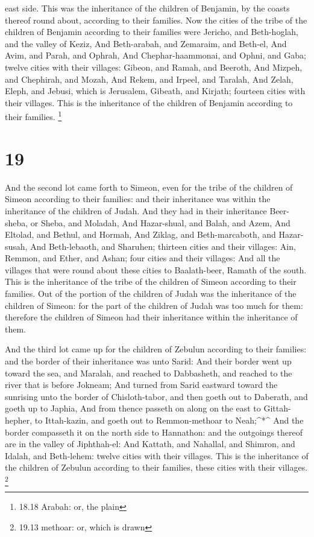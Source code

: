 east side. This was the inheritance of the children of Benjamin, by the
coasts thereof round about, according to their families. 
Now the cities of the tribe of the children of Benjamin according to
their families were Jericho, and Beth-hoglah, and the valley of Keziz,
 And Beth-arabah, and Zemaraim, and Beth-el, 
And Avim, and Parah, and Ophrah,  And Chephar-haammonai,
and Ophni, and Gaba; twelve cities with their villages: 
Gibeon, and Ramah, and Beeroth,  And Mizpeh, and Chephirah,
and Mozah,  And Rekem, and Irpeel, and Taralah,
 And Zelah, Eleph, and Jebusi, which is Jerusalem, Gibeath,
and Kirjath; fourteen cities with their villages. This is the
inheritance of the children of Benjamin according to their families.
\footnote{18.18 Arabah: or, the plain}

\hypertarget{section-18}{%
\section{19}\label{section-18}}

 And the second lot came forth to Simeon, even for the tribe
of the children of Simeon according to their families: and their
inheritance was within the inheritance of the children of Judah.
 And they had in their inheritance Beer-sheba, or Sheba, and
Moladah,  And Hazar-shual, and Balah, and Azem, 
And Eltolad, and Bethul, and Hormah,  And Ziklag, and
Beth-marcaboth, and Hazar-susah,  And Beth-lebaoth, and
Sharuhen; thirteen cities and their villages:  Ain, Remmon,
and Ether, and Ashan; four cities and their villages:  And
all the villages that were round about these cities to Baalath-beer,
Ramath of the south. This is the inheritance of the tribe of the
children of Simeon according to their families.  Out of the
portion of the children of Judah was the inheritance of the children of
Simeon: for the part of the children of Judah was too much for them:
therefore the children of Simeon had their inheritance within the
inheritance of them.

 And the third lot came up for the children of Zebulun
according to their families: and the border of their inheritance was
unto Sarid:  And their border went up toward the sea, and
Maralah, and reached to Dabbasheth, and reached to the river that is
before Jokneam;  And turned from Sarid eastward toward the
sunrising unto the border of Chisloth-tabor, and then goeth out to
Daberath, and goeth up to Japhia,  And from thence passeth
on along on the east to Gittah-hepher, to Ittah-kazin, and goeth out to
Remmon-methoar to Neah;\^{}*\^{}  And the border compasseth
it on the north side to Hannathon: and the outgoings thereof are in the
valley of Jiphthah-el:  And Kattath, and Nahallal, and
Shimron, and Idalah, and Beth-lehem: twelve cities with their villages.
 This is the inheritance of the children of Zebulun
according to their families, these cities with their villages.
\footnote{19.13 methoar: or, which is drawn}


